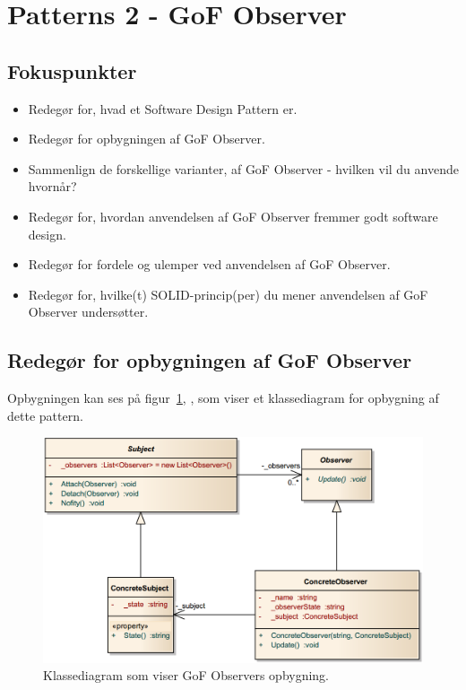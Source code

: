 \section{Patterns 2 - GoF Observer}

\subsection{Fokuspunkter}

\begin{itemize}
	\item Redegør for, hvad et Software Design Pattern er.
	\item Redegør for opbygningen af GoF Observer.
	\item Sammenlign de forskellige varianter, af GoF Observer - hvilken vil du anvende hvornår?
	\item Redegør for, hvordan anvendelsen af GoF Observer fremmer godt software design.
	\item Redegør for fordele og ulemper ved anvendelsen af GoF Observer.
	\item Redegør for, hvilke(t) SOLID-princip(per) du mener anvendelsen af GoF Observer undersøtter.
\end{itemize}



\subsection{Redegør for opbygningen af GoF Observer}
Opbygningen kan ses på figur~\ref{fig:observer_classdiagram}, \pageref{fig:observer_classdiagram}, som viser et klassediagram for opbygning af dette pattern.

\begin{figure}[h]
	\centering
	\includegraphics[width=\linewidth]{figs/observer_classdiagram}
	\caption[GoF Observer klassediagram]{Klassediagram som viser GoF Observers opbygning.}
	\label{fig:observer_classdiagram}
\end{figure}


